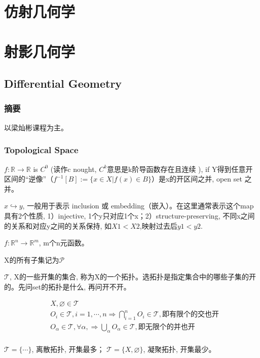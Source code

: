 \documentclass[UTF8]{../09-Mathematics}
\begin{document}
\chapter{仿射几何学}
\chapter{射影几何学}




\section{Differential Geometry}
\subsection{摘要}
以梁灿彬课程为主。


\subsection{Topological Space}


$f: \mathbb{R} \to \mathbb{R} $ is $C^0$ (读作c nought, $C^k$意思是k阶导函数存在且连续 ),  if Y得到任意开区间的“逆像”（$f^{-1}[B] := \{x \in X | f(x) \in B\}$）是x的开区间之并, open set 之并。

$x \hookrightarrow y$, 一般用于表示 inclusion 或 embedding（嵌入）。在这里通常表示这个map具有2个性质, 1）injective, 1个y只对应1个x；2）structure-preserving, 不同x之间的关系和对应y之间的关系保持, 如$X1 < X2$,映射过去后$y1 < y2$.

$f: \mathbb{R}^n \to \mathbb{R}^m $,  m个n元函数。

X的所有子集记为$\mathscr P$

$\mathscr T$, X的一些开集的集合, 称为X的一个拓扑。选拓扑是指定集合中的哪些子集的开的。先问set的拓扑是什么, 再问开不开。

\begin{equation}
    \begin{split}
    &X, \varnothing \in \mathscr T\\
    &O_i \in\mathscr T, i=1, \cdots, n \Longrightarrow \bigcap _{i=1}^n O_i  \in\mathscr T, 即有限个的交也开 \\
    &O_\alpha \in\mathscr T, \forall \alpha, \Longrightarrow \bigcup  _\alpha  O_\alpha \in\mathscr T,  即无限个的并也开 \\
    \end{split}
  \end{equation}


$\mathscr T = \{ \cdots \}$, 离散拓扑, 开集最多；
$\mathscr T = \{ X, \varnothing \}$, 凝聚拓扑, 开集最少。
\end{document}

